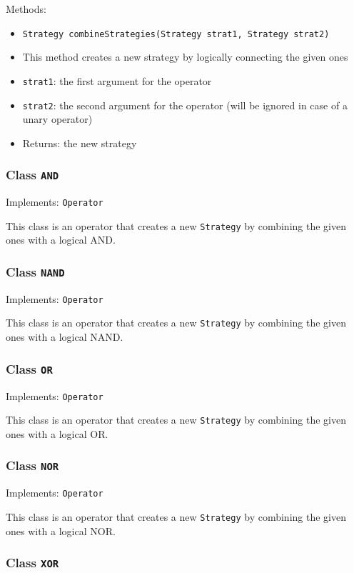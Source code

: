 \documentclass[parskip=full,11pt]{scrartcl}
\begin{document}
Methods:
\begin{itemize}\itemsep -10pt
	\item \texttt{Strategy combineStrategies(Strategy strat1, Strategy strat2)}
	\item[] This method creates a new strategy by logically connecting the given ones
	\item[] \texttt{strat1}: the first argument for the operator
	\item[] \texttt{strat2}: the second argument for the operator (will be ignored in case of a unary operator)
	\item[] Returns: the new strategy
\end{itemize}

\subsubsection{Class \texttt{AND}}
Implements: \texttt{Operator}

This class is an operator that creates a new \texttt{Strategy} by combining the given ones with a logical \textsf{AND}.

\subsubsection{Class \texttt{NAND}}

Implements: \texttt{Operator}

This class is an operator that creates a new \texttt{Strategy} by combining the given ones with a logical \textsf{NAND}.

\subsubsection{Class \texttt{OR}}

Implements: \texttt{Operator}

This class is an operator that creates a new \texttt{Strategy} by combining the given ones with a logical \textsf{OR}.

\subsubsection{Class \texttt{NOR}}

Implements: \texttt{Operator}

This class is an operator that creates a new \texttt{Strategy} by combining the given ones with a logical \textsf{NOR}.

\subsubsection{Class \texttt{XOR}}
\end{document}
